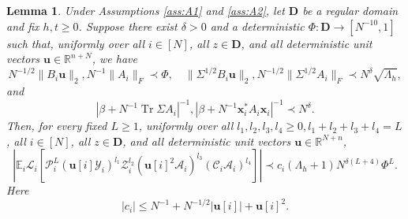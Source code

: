 \documentclass[11pt,reqno]{amsart}
\def\R{\mathbb{R}}
\def\u{\mathbf{u}}
\def\x{\mathbf{x}}
\def\E{\mathbb{E}}
\def\cA{\mathcal{A}}
\def\cY{\mathcal{Y}}
\def\cZ{\mathcal{Z}}
\def\cP{\mathcal{P}}
\def\cC{\mathcal{C}}
\def\cL{\mathcal{L}}
\def\bD{\mathbf{D}}
\def\Tr{\operatorname{Tr}}
\newtheorem{lemma}[theorem]{Lemma}
\theoremstyle{definition}
\numberwithin{equation}{section}
\numberwithin{figure}{section}
\begin{document}
\begin{lemma}\label{lem:L_i-bounds}
Under Assumptions \ref{ass:A1} and \ref{ass:A2}, let $\bD$ be a regular domain and fix $h,t\geq 0$. Suppose there exist $\delta>0$ and a deterministic $\Phi:\bD\rightarrow[N^{-10},1]$ such that, uniformly over all $i\in[N]$, all $z\in\bD$, and all deterministic unit vectors $\u\in\R^{n+N}$, we have
\[
    N^{-1/2}\|B_i\u\|_2, N^{-1}\|A_i\|_F\prec\Phi,\quad \|\Sigma^{1/2}B_i\u\|_2, N^{-1/2}\|\Sigma^{1/2}A_i\|_F\prec N^\delta\sqrt{\Lambda_h},
\]
and
\[
    |\beta+N^{-1}\Tr\Sigma A_i|^{-1}, |\beta+N^{-1}\x_i^*A_i\x_i|^{-1}\prec N^\delta.
\]
Then, for every fixed $L\geq 1$, uniformly over all $l_1,l_2,l_3,l_4\geq 0,l_1+l_2+l_3+l_4=L$, all $i\in[N]$, all $z\in\bD$, and all deterministic unit vectors $\u\in\R^{N+n}$,
\[
    |\E_i\cL_i[\cP_i^L(\u[i]\cY_i)^{l_1}\cZ_i^{l_2}(\u[i]^2\cA_i)^{l_3}(\cC_i\cA_i)^{l_4}]|\prec c_i(\Lambda_h+1) N^{\delta (L+4)}\Phi^{L}.
\]
Here
\[
    |c_i|\leq N^{-1}+N^{-1/2}|\u[i]|+\u[i]^2.
\]
\end{lemma}
\end{document}

